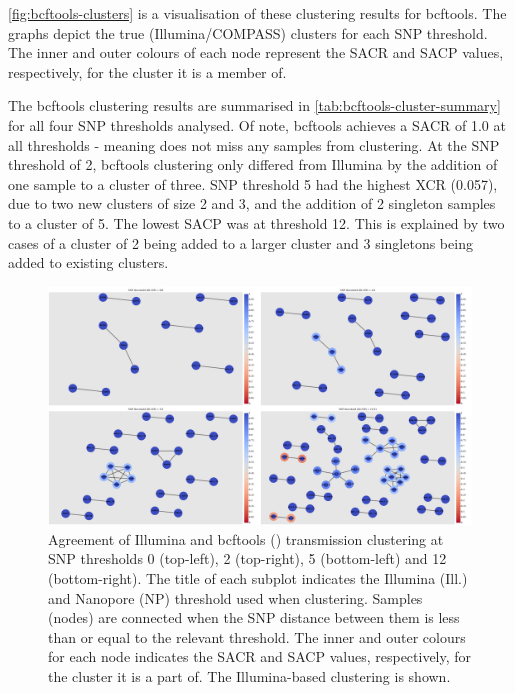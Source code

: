 \autoref{fig:bcftools-clusters} is a visualisation of these
clustering results for bcftools. The graphs depict the true (Illumina/COMPASS) clusters for each SNP threshold. The inner and outer colours of each node
represent the SACR and SACP values, respectively, for the cluster it is a member of.

The bcftools clustering results are summarised in \autoref{tab:bcftools-cluster-summary} for all four SNP thresholds analysed. Of note, bcftools
achieves a SACR of 1.0 at all thresholds - meaning \ont{} does not miss any samples from
clustering. At the SNP threshold of 2, bcftools clustering only differed from Illumina by the addition of one sample to a cluster of three. 
SNP threshold 5 had the highest XCR (0.057), due to two new clusters of size 2 and 3, and the addition of 2 singleton samples to a cluster of 5. 
The lowest SACP was at threshold 12. This is explained by two cases of a cluster of 2 being added to a larger cluster and 3 singletons being added to existing clusters. 

\begin{figure}
\begin{center}
\includegraphics[width=0.90\columnwidth]{Chapter2/Figs/bcftools_clusters.png}
\caption{{Agreement of Illumina and bcftools (\ont{}) transmission clustering at SNP
thresholds 0 (top-left), 2 (top-right), 5 (bottom-left) and 12 (bottom-right). The title of
each subplot indicates the Illumina (Ill.) and Nanopore (NP) threshold
used when clustering. Samples (nodes) are connected when the SNP
distance between them is less than or equal to the relevant threshold.
The inner and outer colours for each node indicates the SACR and SACP
values, respectively, for the cluster it is a part of. The
Illumina-based clustering is shown.
{\label{fig:bcftools-clusters}}%
}}
\end{center}
\end{figure}

